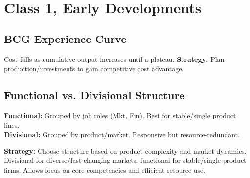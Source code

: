 
\section{Class 1, Early Developments}
\subsection{BCG Experience Curve}
Cost falls as cumulative output increases until a plateau.
\textbf{Strategy:} Plan production/investments to gain competitive cost advantage.


\subsection{Functional vs. Divisional Structure}
\textbf{Functional:} Grouped by job roles (Mkt, Fin). Best for stable/single product
lines. \\
\textbf{Divisional:} Grouped by product/market. Responsive but resource-redundant.

\textbf{Strategy:} Choose structure based on product complexity and market dynamics.
Divisional for diverse/fast-changing markets, functional for
stable/single-product firms. Allows focus on core competencies and efficient
resource use.


